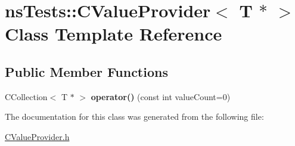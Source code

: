 \hypertarget{classnsTests_1_1CValueProvider_3_01T_01_5_01_4}{\section{ns\+Tests\+:\+:C\+Value\+Provider$<$ T $\ast$ $>$ Class Template Reference}
\label{classnsTests_1_1CValueProvider_3_01T_01_5_01_4}
}
\subsection*{Public Member Functions}
\begin{DoxyCompactItemize}
\item 
\hypertarget{classnsTests_1_1CValueProvider_3_01T_01_5_01_4_a40d44647737aaf50105b0ec38136fd61}{C\+Collection$<$ T $\ast$ $>$ {\bfseries operator()} (const int value\+Count=0)}\label{classnsTests_1_1CValueProvider_3_01T_01_5_01_4_a40d44647737aaf50105b0ec38136fd61}

\end{DoxyCompactItemize}


The documentation for this class was generated from the following file\+:\begin{DoxyCompactItemize}
\item 
\hyperlink{CValueProvider_8h}{C\+Value\+Provider.\+h}\end{DoxyCompactItemize}

